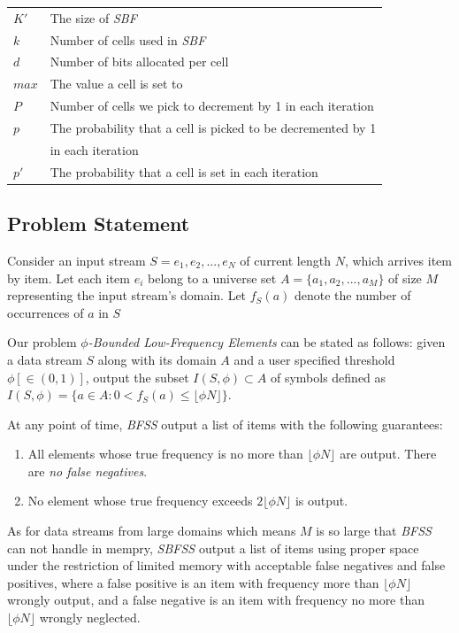 \documentclass[conference]{IEEEtran}
\begin{document}
\begin{table}
\begin{tabular}{ll}
        $K'$ & The size of \emph{SBF}\\
        $k$  &  Number of cells used in \emph{SBF}\\
        $d$  & Number of bits allocated per cell\\
        $max$ & The value a cell is set to\\
        $P$ &  Number of cells we pick to decrement by 1 in each iteration\\
        $p$ &  The probability that a cell is picked to be decremented by 1 \\
        &in each iteration\\
        $p'$ &  The probability that a cell is set in each iteration\\
       \hline
	\end{tabular}
\label{tab:list}

\end{table}

\subsection{Problem Statement}
Consider an input stream $S = e_1,e_2,..., e_N$ of current length $N$, which arrives item by item. Let each item $e_i$ belong to a universe set $A=\{a_1,a_2,...,a_M\}$ of size $M$ representing the input stream's domain. Let $f_S(a)$ denote the number of occurrences of $a$ in $S$\par

Our problem $\phi$\emph{-Bounded Low-Frequency Elements} can be stated as follows: given a data stream $S$ along with its domain $A$ and a user specified threshold $\phi[\in (0,1)]$, output the subset $I(S,\phi) \subset A$ of symbols defined as $I(S,\phi) = \{a\in A : 0 < f_S(a)\leq\lfloor \phi N\rfloor\}$.\par

At any point of time, \emph{BFSS} output a list of items with the following guarantees: 
\begin{enumerate}
\item  All elements whose true frequency is no more than $\lfloor\phi N\rfloor$ are output. There are \emph{no false negatives}.
\item  No element whose true frequency exceeds $2\lfloor\phi N\rfloor$ is output.
\end{enumerate} 

As for data streams from large domains which means $M$ is so large that \emph{BFSS} can not handle in mempry, \emph{SBFSS} output a list of items using proper space under the restriction of limited memory with acceptable false negatives and false positives, where a false positive is an item with frequency more than $\lfloor\phi N\rfloor$ wrongly output, and a false negative is an item with frequency no more than $\lfloor\phi N\rfloor$ wrongly neglected.
\end{document}

